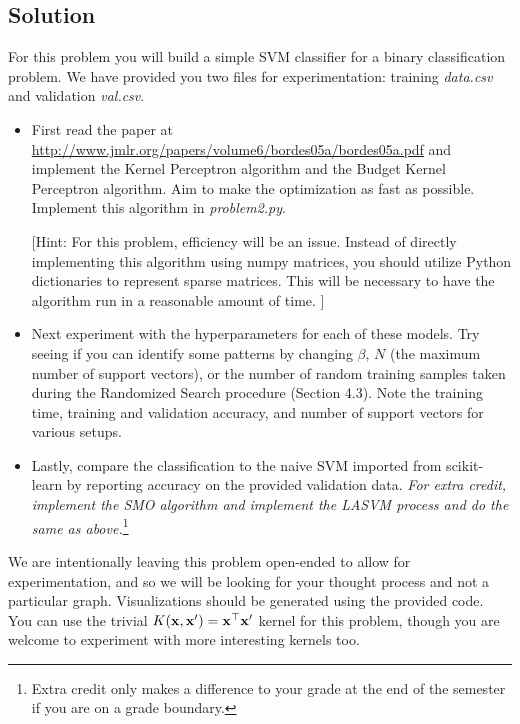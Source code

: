 \documentclass[submit]{harvardml}
\begin{document}
\subsection*{Solution}

\newpage

\begin{problem}


  For this problem you will build a simple SVM classifier for a binary
  classification problem. We have provided you two files for
  experimentation: training \textit{data.csv} and validation
  \textit{val.csv}.
\begin{itemize}
\item First read the paper at
  \url{http://www.jmlr.org/papers/volume6/bordes05a/bordes05a.pdf} and
  implement the Kernel Perceptron algorithm and the Budget Kernel
  Perceptron algorithm. Aim to make the optimization as fast as possible.
  Implement this algorithm in \textit{problem2.py}.

  [Hint: For this problem, efficiency will be an issue. Instead of directly
implementing this algorithm using numpy matrices, you should utilize
Python dictionaries to represent sparse matrices. This will be necessary 
to have the algorithm run in a reasonable amount of time.   
]
\item Next experiment with the hyperparameters for each of these
  models. Try seeing if you can identify some patterns by changing
  $\beta$, $N$ (the maximum number of support vectors), or the number
  of random training samples taken during the Randomized Search
  procedure (Section 4.3).  Note the training time, training and
  validation accuracy, and number of support vectors for various
  setups.
\item Lastly, compare the classification to the naive SVM imported from
scikit-learn by reporting accuracy on the provided validation
data. {\em For extra credit, implement the SMO algorithm and implement
  the LASVM process and do the same as above.}\footnote{Extra credit
  only makes a difference to your grade at the end of the semester if
  you are on a grade boundary.}

\end{itemize}


We are intentionally leaving this problem open-ended to allow for
experimentation, and so we will be looking for your thought process
and not a particular graph.  Visualizations should be generated 
using the provided code. You can use the trivial
$K(\mathbf{x},\mathbf{x}') = \mathbf{x}^\top \mathbf{x}'$ kernel for this problem,
though you are welcome to experiment with more interesting kernels
too.



\end{problem}
\end{document}

